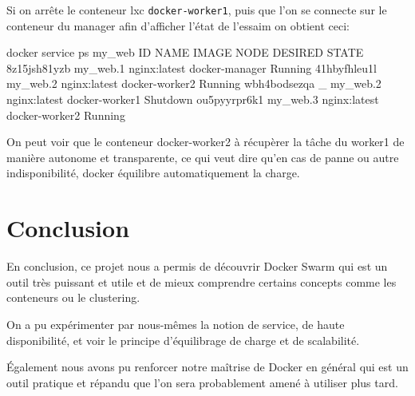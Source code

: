 Si on arrête le conteneur lxc \verb:docker-worker1:, puis que l'on se connecte sur le
conteneur du manager afin d'afficher l'état de l'essaim on obtient ceci:

\begin{bash}
docker service ps my_web
ID           NAME         IMAGE        NODE           DESIRED STATE   
8z15jsh81yzb my_web.1     nginx:latest docker-manager Running         
41hbyfhleu1l my_web.2     nginx:latest docker-worker2 Running        
wbh4bodsezqa  \_ my_web.2 nginx:latest docker-worker1 Shutdown      
ou5pyyrpr6k1 my_web.3     nginx:latest docker-worker2 Running      
\end{bash}

On peut voir que le conteneur docker-worker2 à récupèrer la tâche du worker1 de manière
autonome et transparente, ce qui veut dire qu'en cas de panne ou autre indisponibilité, 
docker équilibre automatiquement la charge.


\chapter{Conclusion}

En conclusion, ce projet nous a permis de découvrir Docker Swarm qui est un outil très puissant
et utile et de mieux comprendre certains concepts comme les conteneurs ou le clustering.\newline

On a pu expérimenter par nous-mêmes la notion de service, de haute disponibilité, et voir le
principe d'équilibrage de charge et de scalabilité.\newline

Également nous avons pu renforcer notre maîtrise de Docker en général qui est un outil pratique
et répandu que l'on sera probablement amené à utiliser plus tard.
